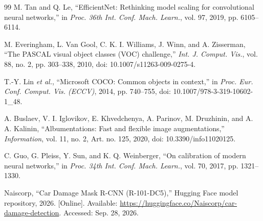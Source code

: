 \documentclass[conference]{IEEEtran}
\begin{document}
\begin{thebibliography}{99}
M. Tan and Q. Le, ``EfficientNet: Rethinking model scaling for convolutional neural networks,'' in \emph{Proc. 36th Int. Conf. Mach. Learn.}, vol. 97, 2019, pp. 6105--6114.

M. Everingham, L. Van Gool, C. K. I. Williams, J. Winn, and A. Zisserman, ``The PASCAL visual object classes (VOC) challenge,'' \emph{Int. J. Comput. Vis.}, vol. 88, no. 2, pp. 303--338, 2010, doi: 10.1007/s11263-009-0275-4.

T.-Y. Lin \emph{et al.}, ``Microsoft COCO: Common objects in context,'' in \emph{Proc. Eur. Conf. Comput. Vis. (ECCV)}, 2014, pp. 740--755, doi: 10.1007/978-3-319-10602-1\_48.

A. Buslaev, V. I. Iglovikov, E. Khvedchenya, A. Parinov, M. Druzhinin, and A. A. Kalinin, ``Albumentations: Fast and flexible image augmentations,'' \emph{Information}, vol. 11, no. 2, Art. no. 125, 2020, doi: 10.3390/info11020125.

C. Guo, G. Pleiss, Y. Sun, and K. Q. Weinberger, ``On calibration of modern neural networks,'' in \emph{Proc. 34th Int. Conf. Mach. Learn.}, vol. 70, 2017, pp. 1321--1330.

Naiscorp, ``Car Damage Mask R-CNN (R-101-DC5),'' Hugging Face model repository, 2026. [Online]. Available: \url{https://huggingface.co/Naiscorp/car-damage-detection}. Accessed: Sep. 28, 2026.

\end{thebibliography}
\end{document}
